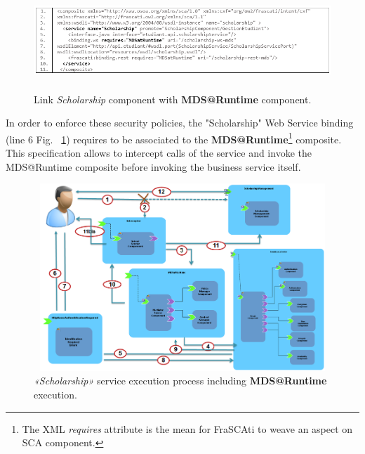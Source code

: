 \documentclass[runningheads,a4paper]{llncs}
\begin{document}
\begin{figure}  
\center
\includegraphics[height=105pt,width=380pt]{scholarshipComposite.png}
\caption{Link \emph{Scholarship} component with \textbf{MDS@Runtime} component.}
\label{fig:gestionEtudiant}
\end{figure}


In order to enforce these security policies, the "Scholarship"  Web Service binding (line 6 Fig. ~\ref{fig:gestionEtudiant}) requires to be associated to the \textbf{MDS@Runtime}\footnote{The XML \emph{requires} attribute is the mean for FraSCAti to weave an aspect on SCA component.} composite. This specification allows to intercept calls of the service and invoke the  MDS@Runtime composite before invoking the business service itself.
\begin{figure} 
\center
\includegraphics[height=200pt, width=320pt]{process.png}
\caption{\emph{«Scholarship»} service execution process including   \textbf{MDS@Runtime} execution.}
\label{fig:process}
\end{figure}
\end{document}
